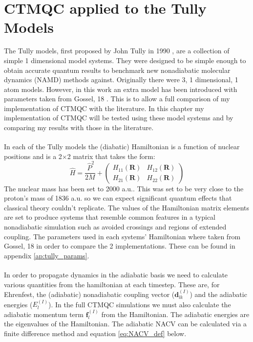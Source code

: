 \chapter{CTMQC applied to the Tully Models}
\label{chap:tully_models}

The Tully models, first proposed by John Tully in 1990 \cite{tully_molecular_1990}, are a collection of simple 1 dimensional model systems. They were designed to be simple enough to obtain accurate quantum results to benchmark new nonadiabatic molecular dynamics (NAMD) methods against. Originally there were 3, 1 dimensional, 1 atom models. However, in this work an extra model has been introduced with parameters taken from Gossel, 18 \cite{gossel_coupled-trajectory_2018}. This is to allow a full comparison of my implementation of CTMQC with the literature. In this chapter my implementation of CTMQC will be tested using these model systems and by comparing my results with those in the literature.
\\\\
In each of the Tully models the (diabatic) Hamiltonian is a function of nuclear positions and is a 2$\times$2 matrix that takes the form:
\begin{equation}
  \hat{H} = \frac{\ \hat{P} ^2}{2M} + \left(
                                              \begin{array}{cc}
                                                H_{11}(\mathbf{R}) & H_{12}(\mathbf{R}) \\
                                                H_{21}(\mathbf{R}) & H_{22}(\mathbf{R})
                                              \end{array}
                                         \right)
\end{equation}
The nuclear mass has been set to 2000 a.u.. This was set to be very close to the proton's mass of 1836 a.u. so we can expect significant quantum effects that classical theory couldn't replicate. The values of the Hamiltonian matrix elements are set to produce systems that resemble common features in a typical nonadiabatic simulation such as avoided crossings and regions of extended coupling. The parameters used in each systems' Hamiltonian where taken from Gossel, 18 \cite{gossel_coupled-trajectory_2018} in order to compare the 2 implementations. These can be found in appendix \ref{ap:tully_params}.
\\\\
In order to propagate dynamics in the adiabatic basis we need to calculate various quantities from the hamiltonian at each timestep. These are, for Ehrenfest, the (adiabatic) nonadiabatic coupling vector ($\mathbf{d}_{lk}^{(I)}$) and the adiabatic energies ($E_{l}^{(I)}$). In the full CTMQC simulations we must also calculate the adiabatic momentum term $\mathbf{f}_{l}^{(I)}$ from the Hamiltonian. The adiabatic energies are the eigenvalues of the Hamiltonian. The adiabatic NACV can be calculated via a finite difference method and equation \eqref{eq:NACV_def} below.
